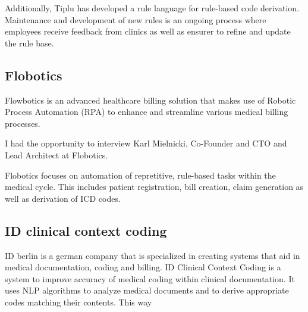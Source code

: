 Additionally, Tiplu has developed a rule language for rule-based code derivation.
Maintenance and development of new rules is an ongoing process where employees receive feedback from clinics as well as ensurer to refine and update the rule base.


\subsection{Flobotics}
Flowbotics is an advanced healthcare billing solution that makes use of Robotic Process Automation (RPA) to enhance and
streamline various medical billing processes.

I had the opportunity to interview Karl Mielnicki, Co-Founder and CTO and Lead Architect at Flobotics.

Flobotics focuses on automation of repretitive, rule-based tasks within the medical cycle.
This includes patient registration, bill creation, claim generation as well as derivation of ICD codes.


%



\subsection{ID clinical context coding}
ID berlin is a german company that is specialized in creating systems that aid in medical documentation, coding and billing.
ID Clinical Context Coding is a system to improve accuracy of medical coding within clinical documentation.
It uses NLP algorithms to analyze medical documents and to derive appropriate codes matching their contents.
This way

